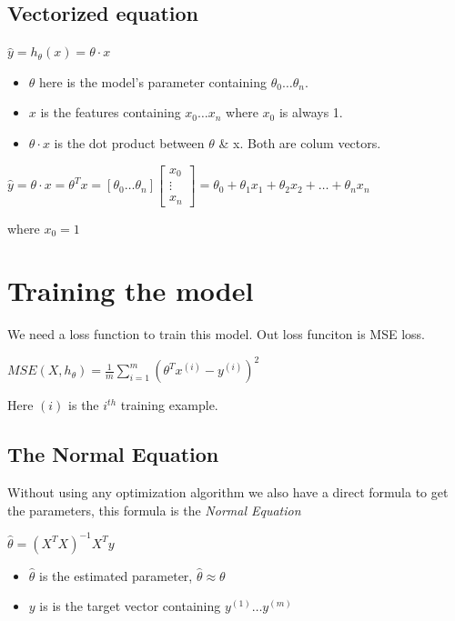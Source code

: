 \documentclass[
]{report}
\providecommand{\tightlist}{%
  \setlength{\itemsep}{0pt}\setlength{\parskip}{0pt}}\usepackage{longtable,booktabs,array}
\begin{document}
\hypertarget{vectorized-equation}{%
\subsection{Vectorized equation}\label{vectorized-equation}}

\(\hat{y} = h_{\theta}(x) = \theta \cdot x\)

\begin{itemize}
\tightlist
\item
  \(\theta\) here is the model's parameter containing
  \(\theta_{0} \dots \theta_{n}\).
\item
  \(x\) is the features containing \(x_{0} \dots x_{n}\) where \(x_{0}\)
  is always 1.
\item
  \(\theta \cdot x\) is the dot product between \(\theta\) \& x. Both
  are colum vectors.
\end{itemize}

\(\hat{y} = \theta \cdot x = \theta^{T}x = [\theta_{0} \dots \theta_{n}] \begin{bmatrix} x_{0} \\ \vdots \\ x_{n}\end{bmatrix} = \theta_{0} + \theta_{1}x_{1} + \theta_{2}x_{2} + \dots + \theta_{n}x_{n}\)

where \(x_{0} = 1\)

\hypertarget{training-the-model}{%
\section{Training the model}\label{training-the-model}}

We need a loss function to train this model. Out loss funciton is MSE
loss.

\(MSE(X, h_{\theta}) = \frac{1}{m} \sum_{i=1}^m (\theta^T x^{(i)} - y^{(i)})^2\)

Here \((i)\) is the \(i^{th}\) training example.

\hypertarget{the-normal-equation}{%
\subsection{The Normal Equation}\label{the-normal-equation}}

Without using any optimization algorithm we also have a direct formula
to get the parameters, this formula is the \emph{Normal Equation}

\(\hat{\theta} = (X^{T}X)^{-1} X^{T} y\)

\begin{itemize}
\tightlist
\item
  \(\hat{\theta}\) is the estimated parameter,
  \(\hat{\theta} \approx \theta\)
\item
  \(y\) is is the target vector containing \(y^{(1)} \dots y^{(m)}\)
\end{itemize}
\end{document}
